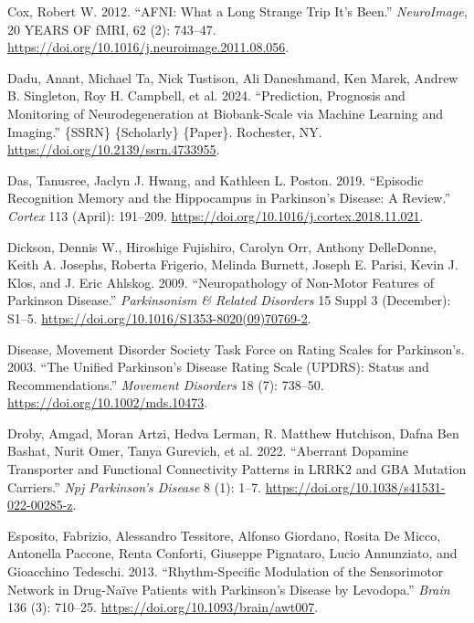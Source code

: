 \documentclass[
  table]{article}
\newlength{\cslhangindent}
\newenvironment{CSLReferences}[2] %
 {\begin{list}{}{%
  \setlength{\itemindent}{0pt}
  \setlength{\leftmargin}{0pt}
  \setlength{\parsep}{0pt}
  \ifodd #1
   \setlength{\leftmargin}{\cslhangindent}
   \setlength{\itemindent}{-1\cslhangindent}
  \fi
  \setlength{\itemsep}{#2\baselineskip}}}
 {\end{list}}
\begin{document}
\begin{CSLReferences}{1}{0}
Cox, Robert W. 2012. {``{AFNI}: {What} a Long Strange Trip It's Been.''}
\emph{NeuroImage}, 20 {YEARS} {OF} {fMRI}, 62 (2): 743--47.
\url{https://doi.org/10.1016/j.neuroimage.2011.08.056}.

Dadu, Anant, Michael Ta, Nick Tustison, Ali Daneshmand, Ken Marek,
Andrew B. Singleton, Roy H. Campbell, et al. 2024. {``Prediction,
{Prognosis} and {Monitoring} of {Neurodegeneration} at {Biobank}-{Scale}
via {Machine} {Learning} and {Imaging}.''} \{SSRN\} \{Scholarly\}
\{Paper\}. Rochester, NY. \url{https://doi.org/10.2139/ssrn.4733955}.

Das, Tanusree, Jaclyn J. Hwang, and Kathleen L. Poston. 2019.
{``Episodic Recognition Memory and the Hippocampus in {Parkinson}'s
Disease: {A} Review.''} \emph{Cortex} 113 (April): 191--209.
\url{https://doi.org/10.1016/j.cortex.2018.11.021}.

Dickson, Dennis W., Hiroshige Fujishiro, Carolyn Orr, Anthony
DelleDonne, Keith A. Josephs, Roberta Frigerio, Melinda Burnett, Joseph
E. Parisi, Kevin J. Klos, and J. Eric Ahlskog. 2009. {``Neuropathology
of Non-Motor Features of {Parkinson} Disease.''} \emph{Parkinsonism \&
Related Disorders} 15 Suppl 3 (December): S1--5.
\url{https://doi.org/10.1016/S1353-8020(09)70769-2}.

Disease, Movement Disorder Society Task Force on Rating Scales for
Parkinson's. 2003. {``The {Unified} {Parkinson}'s {Disease} {Rating}
{Scale} ({UPDRS}): {Status} and Recommendations.''} \emph{Movement
Disorders} 18 (7): 738--50. \url{https://doi.org/10.1002/mds.10473}.

Droby, Amgad, Moran Artzi, Hedva Lerman, R. Matthew Hutchison, Dafna Ben
Bashat, Nurit Omer, Tanya Gurevich, et al. 2022. {``Aberrant Dopamine
Transporter and Functional Connectivity Patterns in {LRRK2} and {GBA}
Mutation Carriers.''} \emph{Npj Parkinson's Disease} 8 (1): 1--7.
\url{https://doi.org/10.1038/s41531-022-00285-z}.

Esposito, Fabrizio, Alessandro Tessitore, Alfonso Giordano, Rosita De
Micco, Antonella Paccone, Renta Conforti, Giuseppe Pignataro, Lucio
Annunziato, and Gioacchino Tedeschi. 2013. {``Rhythm-Specific Modulation
of the Sensorimotor Network in Drug-Na{ï}ve Patients with
{Parkinson}{'}s Disease by Levodopa.''} \emph{Brain} 136 (3): 710--25.
\url{https://doi.org/10.1093/brain/awt007}.


\end{CSLReferences}
\end{document}

